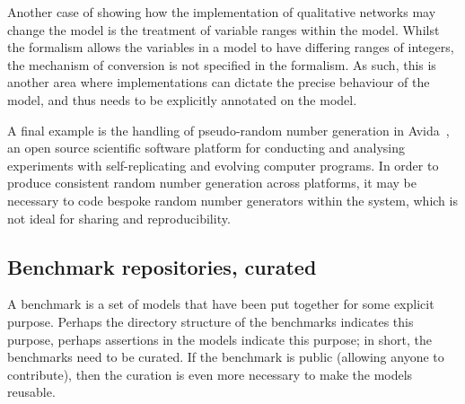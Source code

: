 \documentclass[conference]{IEEEtran}
\begin{document}
Another case of showing how the implementation of qualitative networks
may change the model is the treatment of variable ranges within the
model.  Whilst the formalism allows the variables in a model to have
differing ranges of integers, the mechanism of conversion is not
specified in the formalism. As such, this is another area where
implementations can dictate the precise behaviour of the model, and
thus needs to be explicitly annotated on the model.

A final example is the handling of pseudo-random number generation in
Avida~\cite{ofria+wilke:2004}, an open source scientific software
platform for conducting and analysing experiments with
self-replicating and evolving computer programs. In order to produce
consistent random number generation across platforms, it may be
necessary to code bespoke random number generators within the system,
which is not ideal for sharing and reproducibility.


\subsection{Benchmark repositories, curated}


A benchmark is a set of models that have been put together for some
explicit purpose. Perhaps the directory structure of the benchmarks
indicates this purpose, perhaps assertions in the models indicate
this purpose; in short, the benchmarks need to be curated. If the
benchmark is public (allowing anyone to contribute), then the curation
is even more necessary to make the models reusable.
\end{document}
